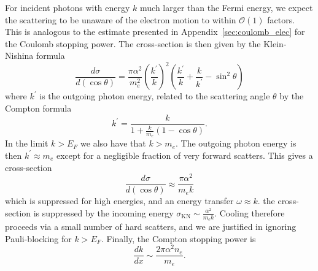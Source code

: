 \documentclass[twocolumn, preprintnumbers,amsmath,amssymb,prd, superscriptaddress]{revtex4}
\newcommand{\OO}{\mathcal{O}}
\def\r{\right)}
\def\l{\left(}
\begin{document}
\begin{appendices}
For incident photons with energy $k$ much larger than the Fermi energy, we expect the scattering to be unaware of the electron motion to within $\OO(1)$ factors. 
This is analogous to the estimate presented in Appendix~\ref{sec:coulomb_elec} for the Coulomb stopping power.
The cross-section is then given by the Klein-Nishina formula
\begin{equation}
\label{KN}
  \frac{d\sigma}{d (\cos \theta)} = \frac{\pi \alpha^2}{m_e^2}
  \l \frac{k^\prime}{k} \r^2
  \l \frac{k^\prime}{k} + \frac{k}{k^\prime} -\sin^2 \theta \r
\end{equation}
where $k^\prime$ is the outgoing photon energy, related to the scattering angle $\theta$ by the Compton formula
\begin{equation}
{k^{\prime }={\frac {k}{1+{\frac {k}{m_e}}(1-\cos \theta )}}}.
\end{equation}
In the limit $k > E_F$ we also have that $k > m_e$. 
The outgoing photon energy is then $k^\prime \approx m_e$ except for a negligible fraction of very forward scatters. 
This gives a cross-section 
\begin{equation}
  \frac{d\sigma}{d (\cos \theta)} \approx \frac{\pi \alpha^2}{m_e k}
\end{equation}
which is suppressed for high energies, and an energy transfer $\omega \approx k$.
 the cross-section is suppressed by the incoming energy $\sigma_\text{KN} \sim \frac{\alpha^2}{m_e k}$.
Cooling therefore proceeds via a small number of hard scatters, and we are justified in ignoring Pauli-blocking for $k > E_F$.
Finally, the Compton stopping power is
\begin{equation}
\label{eq:approx-comptonSP}
  \frac{dk}{dx} \sim \frac{2\pi \alpha^2 n_e}{m_e}.
\end{equation}


\end{appendices}
\end{document}
